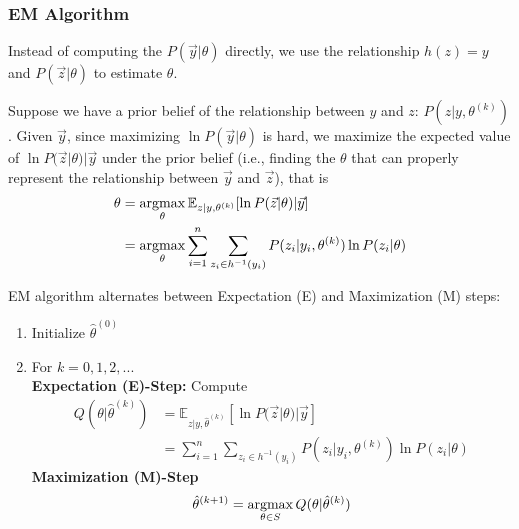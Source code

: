 \documentclass[11pt,a4paper]{article}
\newcommand{\argmax}{\operatornamewithlimits{argmax}}
\begin{document}
\subsubsection*{EM Algorithm}
Instead of computing the $P(\vec{y}|\theta)$ directly, we use the relationship $h(z)=y$ and $P(\vec{z}|\theta)$ to estimate $\theta$.

Suppose we have a prior belief of the relationship between $y$ and $z$: $P(z|y,\theta^{(k)})$. Given $\vec{y}$, since maximizing $\ln P(\vec{y}|\theta)$ is hard, we maximize the expected value of $\ln P(\vec{z}|\theta)|\vec{y}$ under the prior belief (i.e., finding the $\theta$ that can properly represent the relationship between $\vec{y}$ and $\vec{z}$), that is
\begin{equation}
    \begin{aligned}
        \theta&=\argmax_\theta \mathbb{E}_{z|y,\theta^{(k)}} [\ln P(\vec{z}|\theta)|\vec{y}]\\
        &=\argmax_\theta\sum_{i=1}^n \sum_{z_i\in h^{-1}(y_i)}P(z_i|y_i,\theta^{(k)})\ln P(z_i|\theta)
    \end{aligned}
    \nonumber
\end{equation}

EM algorithm alternates between Expectation (E) and Maximization (M) steps:
\begin{enumerate}
    \item Initialize $\hat{\theta}^{(0)}$
    \item For $k=0,1,2,...$\\
    \textbf{Expectation (E)-Step:}
        Compute
        \begin{equation}
            \begin{aligned}
                Q(\theta|\hat{\theta}^{(k)})
                &=\mathbb{E}_{z|y,\hat{\theta}^{(k)}}[\ln P(\vec{z}|\theta)|\vec{y}]\\
                &=\sum_{i=1}^n \sum_{z_i\in h^{-1}(y_i)}P(z_i|y_i,\theta^{(k)})\ln P(z_i|\theta)
            \end{aligned}
            \nonumber
        \end{equation}
    \textbf{Maximization (M)-Step} $$\hat{\theta}^{(k+1)}=\argmax_{\theta\in S}Q(\theta|\hat{\theta}^{(k)})$$
\end{enumerate}
\end{document}
